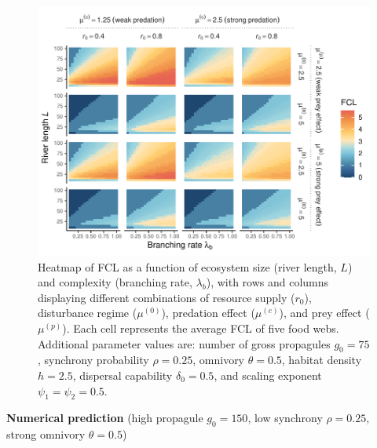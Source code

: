 \begin{figure}
\centering
\includegraphics{../data_fmt/fig_rho025_g75_theta05.pdf}
\caption{Heatmap of FCL as a function of ecosystem size (river length,
\(L\)) and complexity (branching rate, \(\lambda_b\)), with rows and
columns displaying different combinations of resource supply (\(r_0\)),
disturbance regime (\(\mu^{(0)}\)), predation effect (\(\mu^{(c)}\)),
and prey effect (\(\mu^{(p)}\)). Each cell represents the average FCL of
five food webs. Additional parameter values are: number of gross
propagules \(g_0=75\), synchrony probability \(\rho=0.25\), omnivory
\(\theta=0.5\), habitat density \(h=2.5\), dispersal capability
\(\delta_0=0.5\), and scaling exponent \(\psi_1=\psi_2=0.5\).}
\end{figure}

\newpage

\textbf{Numerical prediction} (high propagule \(g_0 = 150\), low
synchrony \(\rho = 0.25\), strong omnivory \(\theta = 0.5\))

